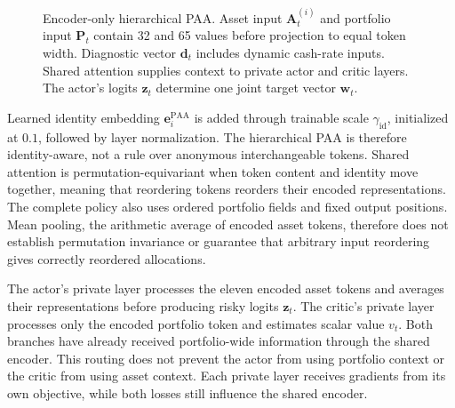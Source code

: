 \begin{figure}[htbp]
\caption{Encoder-only hierarchical PAA. Asset input \(\mathbf A_t^{(i)}\) and portfolio input \(\mathbf P_t\) contain 32 and 65 values before projection to equal token width. Diagnostic vector \(\mathbf d_t\) includes dynamic cash-rate inputs. Shared attention supplies context to private actor and critic layers. The actor's logits \(\mathbf z_t\) determine one joint target vector \(\mathbf w_t\).}
\label{fig:paa-arch}
\end{figure}

Learned identity embedding \(\mathbf e_i^{\mathrm{PAA}}\) is added through trainable scale \(\gamma_{\mathrm{id}}\), initialized at \(0.1\), followed by layer normalization. The hierarchical PAA is therefore identity-aware, not a rule over anonymous interchangeable tokens. Shared attention is permutation-equivariant when token content and identity move together, meaning that reordering tokens reorders their encoded representations. The complete policy also uses ordered portfolio fields and fixed output positions. Mean pooling, the arithmetic average of encoded asset tokens, therefore does not establish permutation invariance or guarantee that arbitrary input reordering gives correctly reordered allocations.

The actor's private layer processes the eleven encoded asset tokens and averages their representations before producing risky logits \(\mathbf z_t\). The critic's private layer processes only the encoded portfolio token and estimates scalar value \(v_t\). Both branches have already received portfolio-wide information through the shared encoder. This routing does not prevent the actor from using portfolio context or the critic from using asset context. Each private layer receives gradients from its own objective, while both losses still influence the shared encoder.


